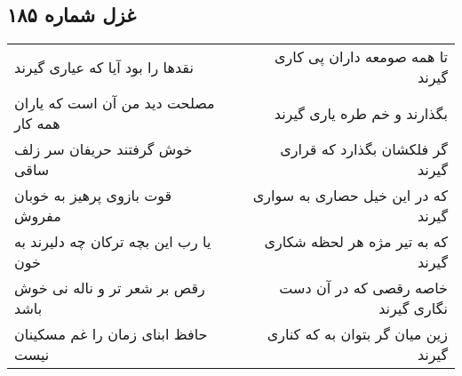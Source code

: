\begin{center}
\section*{غزل شماره ۱۸۵}
\label{sec:sh185}
\begin{longtable}{l p{0.5cm} r}
نقدها را بود آیا که عیاری گیرند
&&
تا همه صومعه داران پی کاری گیرند
\\
مصلحت دید من آن است که یاران همه کار
&&
بگذارند و خم طره یاری گیرند
\\
خوش گرفتند حریفان سر زلف ساقی
&&
گر فلکشان بگذارد که قراری گیرند
\\
قوت بازوی پرهیز به خوبان مفروش
&&
که در این خیل حصاری به سواری گیرند
\\
یا رب این بچه ترکان چه دلیرند به خون
&&
که به تیر مژه هر لحظه شکاری گیرند
\\
رقص بر شعر تر و ناله نی خوش باشد
&&
خاصه رقصی که در آن دست نگاری گیرند
\\
حافظ ابنای زمان را غم مسکینان نیست
&&
زین میان گر بتوان به که کناری گیرند
\\
\end{longtable}
\end{center}
